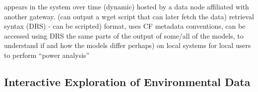 \documentclass[times]{cpeauth}
\begin{document}
appears in the system over time (dynamic)
%
%
%
%
hosted by a data node affiliated with another gateway. (can output a wget script
that can later fetch the data)
retrieval syntax (DRS) - can be scripted)
%
format, uses CF metadata conventions, can be accessed using DRS
the same parts of the output of some/all of the models, to understand if and how
the models differ
perhaps) on local systems for local users to perform ``power analysis''



\subsection{Interactive Exploration of Environmental Data \label{envJon}}

%

\end{document}
